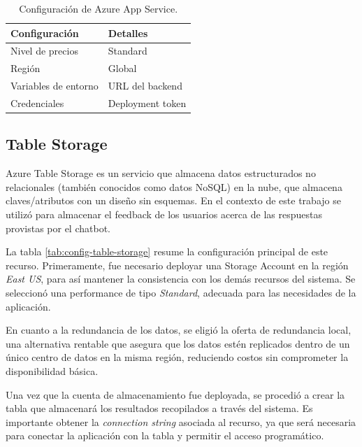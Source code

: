 \begin{table}[h]
	\centering
	\caption[Configuración de Azure App Service]{Configuración de Azure App Service.}
	\begin{tabular}{l l}    
		\toprule
		\textbf{Configuración} 	& \textbf{Detalles} \\
		\midrule
		Nivel de precios        & Standard          \\
		Región                  & Global 			\\		
		Variables de entorno    & URL del backend	\\
		Credenciales            & Deployment token  \\
		\bottomrule
		\hline
	\end{tabular}
	\label{tab:config-static-webapp}
\end{table}

\subsection{Table Storage}

Azure Table Storage es un servicio que almacena datos estructurados no relacionales (también conocidos como datos NoSQL) en la nube, que almacena claves/atributos 
con un diseño sin esquemas. En el contexto de este trabajo se utilizó para almacenar el feedback de los usuarios acerca de las respuestas provistas por el chatbot.

La tabla \ref{tab:config-table-storage} resume la configuración principal de este recurso. Primeramente, fue necesario deployar una Storage Account en la región \textit{East US}, para así mantener la consistencia con los demás 
recursos del sistema. Se seleccionó una performance de tipo \textit{Standard}, adecuada para las necesidades de la aplicación.

En cuanto a la redundancia de los datos, se eligió la oferta de redundancia local, una alternativa rentable que asegura que los datos 
estén replicados dentro de un único centro de datos en la misma región, reduciendo costos sin comprometer la disponibilidad básica.

Una vez que la cuenta de almacenamiento fue deployada, se procedió a crear la tabla que almacenará los resultados 
recopilados a través del sistema. Es importante obtener la \textit{connection string} asociada al recurso, ya que será 
necesaria para conectar la aplicación con la tabla y permitir el acceso programático. 

